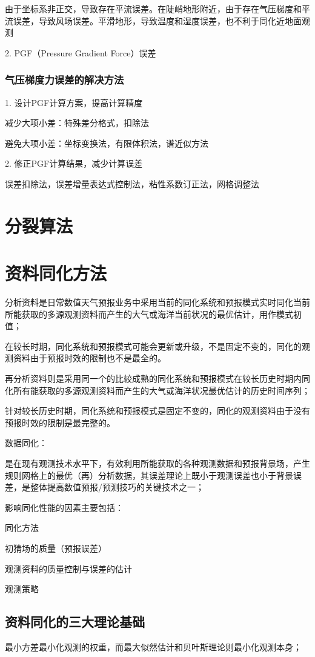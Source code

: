 \documentclass{article}
\begin{document}
由于坐标系非正交，导致存在平流误差。在陡峭地形附近，由于存在气压梯度和平流误差，导致风场误差。平滑地形，导致温度和湿度误差，也不利于同化近地面观测

2. PGF（Pressure Gradient Force）误差

\subsubsection{气压梯度力误差的解决方法}
1. 设计PGF计算方案，提高计算精度

减少大项小差：特殊差分格式，扣除法

避免大项小差：坐标变换法，有限体积法，谱近似方法

2. 修正PGF计算结果，减少计算误差

误差扣除法，误差增量表达式控制法，粘性系数订正法，网格调整法


\section{分裂算法}

\section{资料同化方法}
分析资料是日常数值天气预报业务中采用当前的同化系统和预报模式实时同化当前所能获取的多源观测资料而产生的大气或海洋当前状况的最优估计，用作模式初值；

在较长时期，同化系统和预报模式可能会更新或升级，不是固定不变的，同化的观测资料由于预报时效的限制也不是最全的。

再分析资料则是采用同一个的比较成熟的同化系统和预报模式在较长历史时期内同化所有能获取的多源观测资料而产生的大气或海洋状况最优估计的历史时间序列；

针对较长历史时期，同化系统和预报模式是固定不变的，同化的观测资料由于没有预报时效的限制是最完整的。

数据同化：

是在现有观测技术水平下，有效利用所能获取的各种观测数据和预报背景场，产生规则网格上的最优（再）分析数据，其误差理论上既小于观测误差也小于背景误差，是整体提高数值预报/预测技巧的关键技术之一；

影响同化性能的因素主要包括：

同化方法

初猜场的质量（预报误差）

观测资料的质量控制与误差的估计

观测策略


\subsection{资料同化的三大理论基础}
最小方差最小化观测的权重，而最大似然估计和贝叶斯理论则最小化观测本身；
\end{document}
